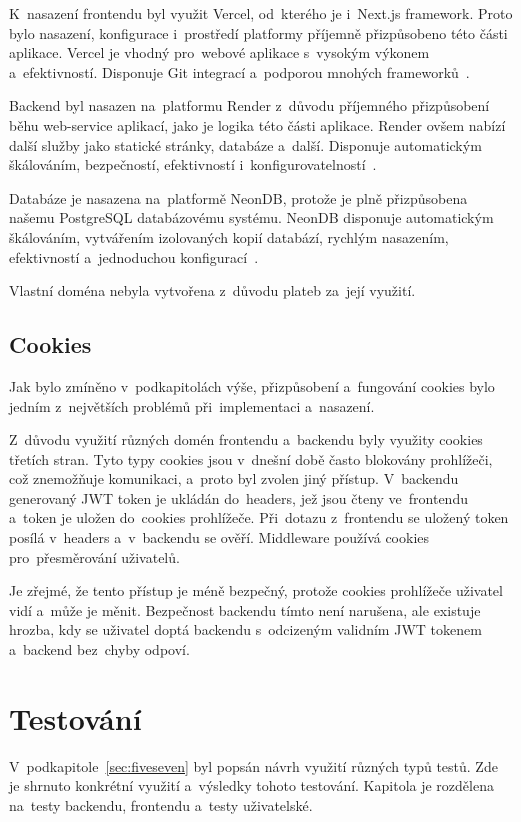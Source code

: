 \documentclass[twoside]{ctuthesis}
\begin{document}
K~nasazení frontendu byl využit Vercel, od~kterého je i~Next.js framework. Proto bylo nasazení, konfigurace i~prostředí platformy příjemně přizpůsobeno této části aplikace. Vercel je vhodný pro~webové aplikace s~vysokým výkonem a~efektivností. Disponuje Git integrací a~podporou mnohých frameworků~\cite{vercel}.

Backend byl nasazen na~platformu Render z~důvodu příjemného přizpůsobení běhu web-service aplikací, jako je logika této části aplikace. Render ovšem nabízí další služby jako statické stránky, databáze a~další. Disponuje automatickým škálováním, bezpečností, efektivností i~konfigurovatelností~\cite{render}.

Databáze je nasazena na~platformě NeonDB, protože je plně přizpůsobena našemu PostgreSQL databázovému systému. NeonDB disponuje automatickým škálováním, vytvářením izolovaných kopií databází, rychlým nasazením, efektivností a~jednoduchou konfigurací~\cite{neondb}.

Vlastní doména nebyla vytvořena z~důvodu plateb za~její využití.

\section{Cookies}
\label{sec:sixsix}

Jak bylo zmíněno v~podkapitolách výše, přizpůsobení a~fungování cookies bylo jedním z~největších problémů při~implementaci a~nasazení.

Z~důvodu využití různých domén frontendu a~backendu byly využity cookies třetích stran. Tyto typy cookies jsou v~dnešní době často blokovány prohlížeči, což znemožňuje komunikaci, a~proto byl zvolen jiný přístup. V~backendu generovaný JWT token je ukládán do~headers, jež jsou čteny ve~frontendu a~token je uložen do~cookies prohlížeče. Při~dotazu z~frontendu se uložený token posílá v~headers a~v~backendu se ověří. Middleware používá cookies pro~přesměrování uživatelů.

Je zřejmé, že tento přístup je méně bezpečný, protože cookies prohlížeče uživatel vidí a~může je měnit. Bezpečnost backendu tímto není narušena, ale existuje hrozba, kdy se uživatel doptá backendu s~odcizeným validním JWT tokenem a~backend bez~chyby odpoví.

\chapter{Testování}

V~podkapitole~\ref{sec:fiveseven} byl popsán návrh využití různých typů testů. Zde je shrnuto konkrétní využití a~výsledky tohoto testování. Kapitola je rozdělena na~testy backendu, frontendu a~testy uživatelské.
\end{document}
